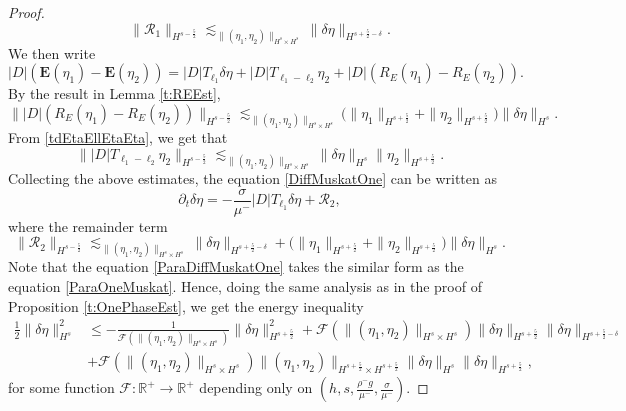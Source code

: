 \documentclass[12pt]{amsart}
\theoremstyle{definition}
\numberwithin{equation}{section}
\newcommand{\p}{\partial}
\newcommand{\R}{\mathbb{R}}
\newcommand{\f}{\frac}
\begin{document}
\begin{proof}
\begin{equation*}
\|\mathcal{R}_1\|_{H^{s-\f52}}\lesssim_{\|(\eta_1, \eta_2)\|_{H^s \times H^s}} \|\delta\eta\|_{H^{s+\f52 -\delta}}.
\end{equation*}
We then write 
\begin{equation*}
 |D|(\mathbf{E}(\eta_1) - \mathbf{E}(\eta_2)) = |D|T_{\ell_1}\delta\eta + |D|T_{\ell_1 - \ell_2}\eta_2 + |D|(R_E(\eta_1)-R_E(\eta_2)).
\end{equation*}
By the result in Lemma \ref{t:REEst}, 
\begin{equation*}
 \||D|(R_E(\eta_1)-R_E(\eta_2))\|_{H^{s-\f52}} \lesssim_{\|(\eta_1, \eta_2)\|_{H^s \times H^s}}  \Big(\|\eta_1\|_{H^{s+\f52}}+ \|\eta_2\|_{H^{s+\f52}} \Big) \|\delta \eta\|_{H^s}.
\end{equation*}
From \eqref{tdEtaEllEtaEta}, we get that
\begin{equation*}
 \| |D|T_{\ell_1 - \ell_2}\eta_2\|_{H^{s-\f52}} \lesssim_{\|(\eta_1, \eta_2)\|_{H^s \times H^s}}  \| \delta \eta\|_{H^s}\|\eta_2\|_{H^{s+\f52}}.
\end{equation*}
Collecting the above estimates, the equation \eqref{DiffMuskatOne} can be written as
\begin{equation} \label{ParaDiffMuskatOne}
\p_t\delta \eta=-\f{\sigma}{\mu^-}|D|T_{\ell_1}\delta\eta+\mathcal{R}_2,
\end{equation}
where the remainder term
\begin{equation*}
\|\mathcal{R}_2\|_{H^{s-\f52}}\lesssim_{\|(\eta_1, \eta_2)\|_{H^s \times H^s}} \|\delta\eta\|_{H^{s+\f52-\delta}} +\Big(\|\eta_1\|_{H^{s+\f52}}+\|\eta_2\|_{H^{s+\f52}}\Big)\| \delta \eta\|_{H^s}.
\end{equation*}
Note that the equation \eqref{ParaDiffMuskatOne} takes the similar form as the equation \eqref{ParaOneMuskat}.
Hence, doing the same analysis as in the proof of Proposition \ref{t:OnePhaseEst}, we get the energy inequality
\begin{align*}
\f12 \|\delta \eta \|^2_{H^s} &\leq - \f{1}{\mathcal{F}(\|(\eta_1, \eta_2)\|_{H^s\times H^s})} \|\delta \eta \|^2_{H^{s+\f52}} + \mathcal{F}(\|(\eta_1, \eta_2)\|_{H^s\times H^s}) \|\delta \eta\|_{H^{s+\f52}} \|\delta \eta\|_{H^{s+\f52-\delta}} \\
&+ \mathcal{F}(\|(\eta_1, \eta_2)\|_{H^s\times H^s})\|(\eta_1, \eta_2)\|_{H^{s+\f52}\times H^{s+\f52}}  \|\delta \eta\|_{H^s} \|\delta \eta\|_{H^{s+\f52}},
\end{align*}
for some function $\mathcal{F}: \R^+ \rightarrow \R^+$ depending only on $(h,s,\frac{\rho^- g}{\mu^-},\frac{\sigma}{\mu^-})$.

\end{proof}
\end{document}
